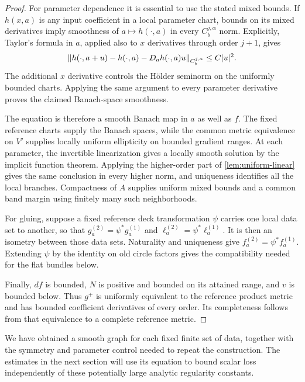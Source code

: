 \begin{proof}
For parameter dependence it is essential to use the stated mixed bounds. If $h(x,a)$ is any input coefficient in a local parameter chart, bounds on its mixed derivatives imply smoothness of $a\mapsto h(\cdot,a)$ in every $C_b^{j,\alpha}$ norm. Explicitly, Taylor's formula in $a$, applied also to $x$ derivatives through order $j+1$, gives
\[
 \lVert h(\cdot,a+u)-h(\cdot,a)-D_a h(\cdot,a)u\rVert_{C_b^{j,\alpha}}
       \le C\lvert u\rvert^2.
\]
The additional $x$ derivative controls the H\"older seminorm on the uniformly bounded charts. Applying the same argument to every parameter derivative proves the claimed Banach-space smoothness.

The equation is therefore a smooth Banach map in $a$ as well as $f$.
The fixed reference charts supply the Banach spaces, while the common
metric equivalence on $V'$ supplies locally uniform ellipticity on bounded
gradient ranges. At each parameter,
the invertible linearization gives a locally smooth solution by the
implicit function theorem. Applying the higher-order part of
\cref{lem:uniform-linear} gives the same conclusion in every higher norm,
and uniqueness identifies all the local branches. Compactness of $A$
supplies uniform mixed bounds and a common band margin using finitely many
such neighborhoods.

For gluing, suppose a fixed reference deck transformation $\psi$ carries
one local data set to another, so that
$g_a^{(2)}=\psi^*g_a^{(1)}$ and $\ell_a^{(2)}=\psi^*\ell_a^{(1)}$.
It is then an isometry between those data sets. Naturality and uniqueness
give $f_a^{(2)}=\psi^*f_a^{(1)}$. Extending $\psi$ by the identity on old
circle factors gives the compatibility needed for the flat bundles below.

Finally, $df$ is bounded, $N$ is positive and bounded on its attained range, and $v$ is bounded below. Thus $g^+$ is uniformly equivalent to the reference product metric and has bounded coefficient derivatives of every order. Its completeness follows from that equivalence to a complete reference metric.
\end{proof}

We have obtained a smooth graph for each fixed finite set of data, together
with the symmetry and parameter control needed to repeat the construction.
The estimates in the next section will use its equation to bound scalar
loss independently of these potentially large analytic regularity constants.
